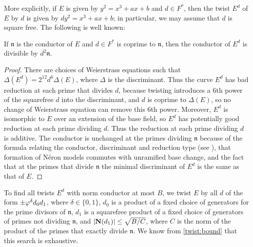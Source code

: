 \documentclass{amsart}
\newcommand{\n}{\mathfrak{n}}
\begin{document}
More explicitly, if $E$ is given by $y^2=x^3+ax+b$ and $d\in F^*$,
then the twist $E^d$ of $E$ by $d$ is given by $dy^2=x^3+ax+b$; in
particular, we may assume that $d$ is square free.  The following
is well known:
\begin{proposition}\label{twist:bound}
If $\n$ is the
conductor of $E$ and $d \in F^*$ is coprime to $\n$, then the
conductor of $E^d$ is divisible by $d^2\n$.
\end{proposition}
\begin{proof}
There are choices of Weierstrass equations such that 
$\Delta(E^d) = 2^{12} d^6 \Delta(E)$, where $\Delta$
is the discriminant.
Thus the curve $E^d$ has bad reduction at each prime that divides $d$,
because twisting introduces a $6$th power of the squarefree $d$ into
the discriminant, and $d$ is coprime to $\Delta(E)$, so no change of
Weierstrass equation can remove this $6$th power.  Moreover, $E^d$ is
isomorphic to $E$ over an extension of the base field, so $E^d$ has
potentially good reduction at each prime dividing $d$.  Thus the
reduction at each prime dividing $d$ is additive.  The conductor is
unchanged at the primes dividing $\n$ because of the formula relating
the conductor, discriminant and reduction type (see \cite[App.~C,\S15]{silverman:aec}),
that formation of N\'eron models commutes with unramified base change,
and the fact that at the primes that divide $\n$ the minimal discriminant of $E^d$ is
the same as that of $E$.
%
\end{proof}

To find all twists $E^d$ with norm conductor at most $B$, we twist $E$
by all $d$ of the form $\pm \varphi^{\delta} d_0 d_1$, where $\delta\in
\{0,1\}$, $d_0$ is a product of a fixed choice of generators for
the prime divisors of $\n$, 
$d_1$ is a squarefree product of a fixed choice of generators of 
primes not dividing $\n$, and
$|\mathbf{N}(d_1)| \leq \sqrt{B/C}$, where $C$ is the norm of the product of
the primes that exactly divide $\n$. We know from \ref{twist:bound} that 
this search is exhaustive.
\end{document}
